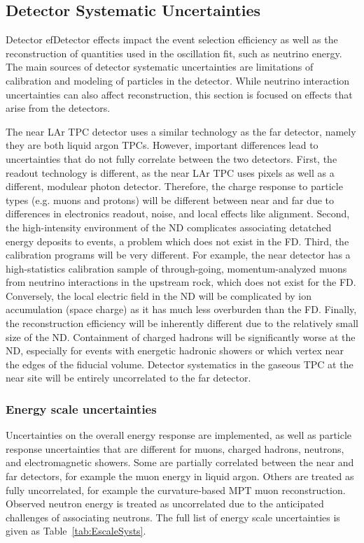 \subsection{Detector Systematic Uncertainties}
\label{sec:detSysts}

Detector efDetector effects impact the event selection efficiency as well as the reconstruction of quantities used in the oscillation fit, such as neutrino energy. The main sources of detector systematic uncertainties are limitations of calibration and modeling of particles in the detector. While neutrino interaction uncertainties can also affect reconstruction, this section is focused on effects that arise from the detectors.

The near LAr TPC detector uses a similar technology as the far detector, namely they are both liquid argon TPCs. However, important differences lead to uncertainties that do not fully correlate between the two detectors. First, the readout technology is different, as the near LAr TPC uses pixels as well as a different, modulear photon detector. Therefore, the charge response to particle types (e.g. muons and protons) will be different between near and far due to differences in electronics readout, noise, and local effects like alignment.  Second, the high-intensity environment of the ND complicates associating detatched energy deposits to events, a problem which does not exist in the FD. Third, the calibration programs will be very different. For example, the near detector has a high-statistics calibration sample of through-going, momentum-analyzed muons from neutrino interactions in the upstream rock, which does not exist for the FD. Conversely, the local electric field in the ND will be complicated by ion accumulation (space charge) as it has much less overburden than the FD. Finally, the reconstruction efficiency will be inherently different due to the relatively small size of the ND. Containment of charged hadrons will be significantly worse at the ND, especially for events with energetic hadronic showers or which vertex near the edges of the fiducial volume. Detector systematics in the gaseous TPC at the near site will be entirely uncorrelated to the far detector.

\subsubsection{Energy scale uncertainties}
\label{sec:EnergyScaleSysts}

Uncertainties on the overall energy response are implemented, as well as particle response uncertainties that are different for muons, charged hadrons, neutrons, and electromagnetic showers. Some are partially correlated between the near and far detectors, for example the muon energy in liquid argon. Others are treated as fully uncorrelated, for example the curvature-based MPT muon reconstruction. Observed neutron energy is treated as uncorrelated due to the anticipated challenges of associating neutrons. The full list of energy scale uncertainties is given as Table~\ref{tab:EscaleSysts}.

